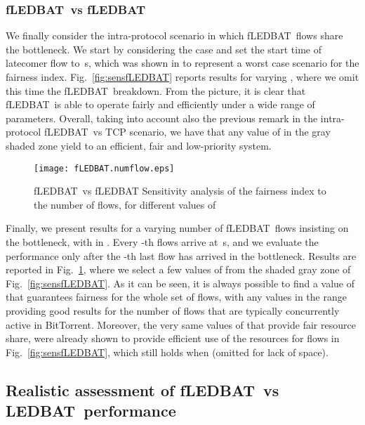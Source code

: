 \documentclass[conference]{IEEEtran}
\newcommand{\figR}[1]{Fig.~\ref{fig:#1}}
\newcommand{\figLC}[2]{
        \caption{#2}
        \label{fig:#1}
        \vspace{-5pt}
}
\newcommand{\btledbat}[0]{LEDBAT}
\newcommand{\fledbat}[0]{fLEDBAT}
\begin{document}
\subsubsection{\fledbat\ vs \fledbat}

We finally consider the intra-protocol scenario in which  \fledbat\ flows share the bottleneck. We start by considering the  case and set the start time of latecomer flow to \,s, which was shown in \cite{icccn10} to
represent a worst case scenario for the fairness index.
\figR{sensfLEDBAT} reports results for varying , where we omit this time the \fledbat\ breakdown. From the picture, it is clear  that \fledbat\ is able to operate fairly and efficiently under a wide range of parameters. Overall, taking into account also the previous remark in the intra-protocol \fledbat\ vs TCP scenario, we have that any value of  in the gray shaded zone yield to an efficient, fair  and low-priority system.


\begin{figure}[t]
    \begin{center}
       \texttt{[image: fLEDBAT.numflow.eps]}
        \figLC{sensN}{\fledbat\ vs \fledbat\: Sensitivity analysis of the fairness index to the number of flows, for different values of }
    \end{center}
\vspace{-4mm}
\end{figure}




Finally, we  present results for a varying number of \fledbat\ flows insisting on the bottleneck, with in . Every -th flows arrive at  \,s, and we evaluate the performance only after the -th last flow has arrived in the bottleneck.
Results are reported in  \figR{sensN}, where we select a few values of  from the shaded gray zone of \figR{sensfLEDBAT}.  As it can be seen, it is always possible to find a value of    that guarantees fairness for the whole set of flows, with any values in the range providing good results for the number of flows that are typically concurrently active in BitTorrent.  Moreover,  the very same values of   that provide fair resource share, were already shown to provide efficient use of the resources for  flows in  \figR{sensfLEDBAT}, which still holds when  (omitted for lack of space).


\subsection{Realistic assessment of \fledbat\ vs \btledbat\ performance}
\end{document}
